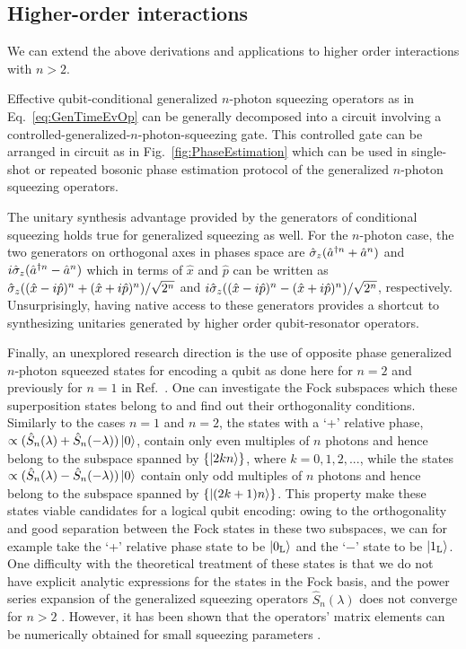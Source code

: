 {\subsection{Higher-order interactions}}
{We can extend the above derivations and applications to higher order interactions with $n>2$.}

{
Effective qubit-conditional generalized $n$-photon squeezing operators as in Eq.~\eqref{eq:GenTimeEvOp} can be generally decomposed into a circuit involving a controlled-generalized-$n$-photon-squeezing gate. This controlled gate can be arranged in circuit as in Fig.~\ref{fig:PhaseEstimation} which can be used in single-shot or repeated bosonic phase estimation protocol of the generalized $n$-photon squeezing operators.}

{
The unitary synthesis advantage provided by the generators of conditional squeezing holds true for generalized squeezing as well. For the $n$-photon case, the two generators on orthogonal axes in phases space are $\hat{\sigma}_z(\hat{a}^{\dagger n} +\hat{a}^n)$ and $i\hat{\sigma}_z(\hat{a}^{\dagger n} - \hat{a}^n)$ which in terms of $\hat{x}$ and $\hat{p}$ can be written as $\hat{\sigma}_z((\hat{x}-i\hat{p})^n +(\hat{x}+i\hat{p})^n)/\sqrt{2^n}$ and $i\hat{\sigma}_z((\hat{x}-i\hat{p})^n -(\hat{x}+i\hat{p})^n)/\sqrt{2^n}$, respectively. Unsurprisingly, having native access to these generators provides a shortcut to synthesizing unitaries generated by higher order qubit-resonator operators.}

Finally, an unexplored research direction is the use of opposite phase generalized $n$-photon squeezed states for encoding a qubit as done here for $n=2$ and previously for $n=1$ in Ref.~\cite{CochraneCatCode}. One can investigate the Fock subspaces which these superposition states belong to and find out their orthogonality conditions. Similarly to the cases $n=1$ and $n=2$, the states with a `+' relative phase, $\propto(\hat{S}_n(\lambda) + \hat{S}_n(-\lambda))\ket{0}$, contain only even multiples of $n$ photons and hence belong to the subspace spanned by $\{\ket{2kn}\}$, where $k=0,1,2,...$, while the states $\propto(\hat{S}_n(\lambda) - \hat{S}_n(-\lambda))\ket{0}$ contain only odd multiples of $n$ photons and hence belong to the subspace spanned by $\{\ket{(2k+1)n}\}$. This property make these states viable candidates for a logical qubit encoding: owing to the orthogonality and good separation between the Fock states in these two subspaces, we can for example take the `+' relative phase state to be $\ket{0_{\text{L}}}$ and the `$-$' state to be $\ket{1_{\text{L}}}$. One difficulty with the theoretical treatment of these states is that we do not have explicit analytic expressions for the states in the Fock basis, and the power series expansion of the generalized squeezing operators $\hat{S}_n(\lambda)$ does not converge for $n>2$ \cite{SqueezingDivergence}. However, it has been shown that the operators' matrix elements can be numerically obtained for small squeezing parameters \cite{GeneralizedSqueezing,SqueezingStats}.  
\\

